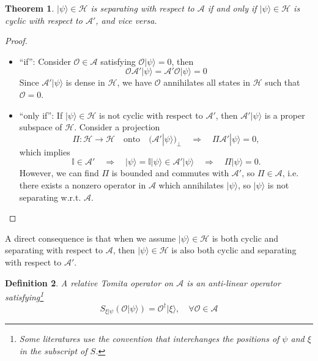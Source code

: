 \documentclass[a4paper,11pt]{article}
\newtheorem{thm}{Theorem}[section]
\newtheorem{defn}[thm]{Definition}
\newcommand{\ket}[1]{| #1 \rangle } %
\renewcommand{\=}[1]{\stackrel{#1}{=}} %
\def\A{\mathcal{A}}
\def\O{\mathcal{O}}
\def\H{\mathcal{H}}
\begin{document}
\begin{thm}\label{thm:cs}
	$\ket{\psi}\in\H$ is separating with respect to $\A$ if and only if $\ket{\psi}\in\H$ is cyclic with respect to $\A'$, and vice versa.
\end{thm}

\begin{proof}
	\begin{itemize}
		\item ``if'': Consider $\O\in\A$ satisfying $\O\ket{\psi}=0$, then 
		\begin{equation}
			\O\A'\ket{\psi}=\A'\O\ket{\psi}=0
		\end{equation}
		Since $\A'\ket{\psi}$ is dense in $\H$, we have $\O$ annihilates all states in $\H$ such that $\O=0$.
		
		
		\item ``only if'': If $\ket{\psi}\in\H$ is not cyclic with respect to $\A'$, then $\A'\ket{\psi}$ is a proper subspace of $\H$. Consider a projection 
		\begin{equation}
			\Pi:\H\rightarrow\H \quad \text{onto}\quad (\A'\ket{\psi})_{\perp}\quad \Rightarrow \quad \Pi\A'\ket{\psi}=0,
		\end{equation}
		which implies
		\begin{equation}
			\mathbb{I}\in \A'\quad \Rightarrow \quad \ket{\psi}=\mathbb{I}\ket{\psi}\in \A'\ket{\psi}\quad \Rightarrow \quad \Pi\ket{\psi}=0.
		\end{equation}
		However, we can find $\Pi$ is bounded and commutes with $\A'$, so $\Pi\in\A$, i.e. there exists a nonzero operator in $\A$ which annihilates $\ket{\psi}$, so $\ket{\psi}$ is not separating w.r.t. $\A$.
	\end{itemize}
	
\end{proof}

A direct consequence is that when we assume $\ket{\psi}\in\H$ is both cyclic and separating with respect to $\A$, then $\ket{\psi}\in\H$ is also both cyclic and separating with respect to $\A'$.












\begin{defn}
	A relative Tomita operator on $\A$ is an anti-linear operator satisfying\footnote{Some literatures use the convention that interchanges the positions of $\psi$ and $\xi$ in the subscript of $S$.}
	\begin{equation}
		S_{\xi|\psi}\left(\O\ket{\psi}\right)=\O^\dagger \ket{\xi},\quad \forall \O\in\A
	\end{equation}
\end{defn}
\end{document}
